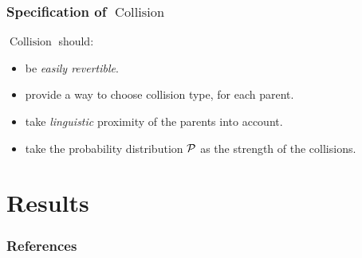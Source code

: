 \documentclass[ratio=169]{beamercours}
\DeclareMathOperator{\coll}{Collision}
\begin{document}
\begin{frame}
	\frametitle{Specification of $\coll$}
	$\coll$ should:
	\begin{itemize}[<+->]
		\item be \emph{easily revertible}.
		\item provide a way to choose collision type, for each parent.
		\item take \emph{linguistic} proximity of the parents into account.
		\item take the probability distribution $\mathcal{P}$ as the strength of the collisions.
	\end{itemize}
\end{frame}


\begin{frame}[allowframebreaks]

\end{frame}
\section{Results}


\begin{frame}[t]
	\frametitle{References}
	
	
\end{frame}
\end{document}
